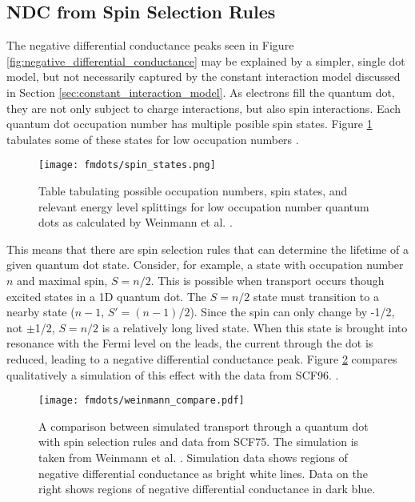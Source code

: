 \subsection{NDC from Spin Selection Rules}
\label{sec:single_dot_model}

The negative differential conductance peaks seen in Figure \ref{fig:negative_differential_conductance} may be explained by a simpler, single dot model, but not necessarily captured by the constant interaction model discussed in Section \ref{sec:constant_interaction_model}. As electrons fill the quantum dot, they are not only subject to charge interactions, but also spin interactions. Each quantum dot occupation number has multiple posible spin states. Figure \ref{fig:spin_states} tabulates some of these states for low occupation numbers \cite{Weinmann1994}.

\begin{figure}
    \centering
    \texttt{[image: fmdots/spin\_states.png]}
    \caption{Table tabulating possible occupation numbers, spin states, and relevant energy level splittings for low occupation number quantum dots as calculated by Weinmann et al. \cite{Weinmann1994}.}
    \label{fig:spin_states}
\end{figure}

This means that there are spin selection rules that can determine the lifetime of a given quantum dot state. Consider, for example, a state with occupation number $n$ and maximal spin, $S=n/2$. This is possible when transport occurs though excited states in a 1D quantum dot. The $S=n/2$ state must transition to a nearby state ($n-1$, $S'=(n-1)/2$). Since the spin can only change by -1/2, not $\pm$1/2, $S=n/2$ is a relatively long lived state. When this state is brought into resonance with the Fermi level on the leads, the current through the dot is reduced, leading to a negative differential conductance peak. Figure \ref{fig:weinmann_compare} compares qualitatively a simulation of this effect with the data from SCF96. \cite{Weinmann1995}. 

\begin{figure}
    \centering
    \texttt{[image: fmdots/weinmann\_compare.pdf]}
    \caption{A comparison between simulated transport through a quantum dot with spin selection rules and data from SCF75. The simulation is taken from Weinmann et al. \cite{Weinmann1995}. Simulation data shows regions of negative differential conductance as bright white lines. Data on the right shows regions of negative differential conductance in dark blue.}
    \label{fig:weinmann_compare}
\end{figure}

